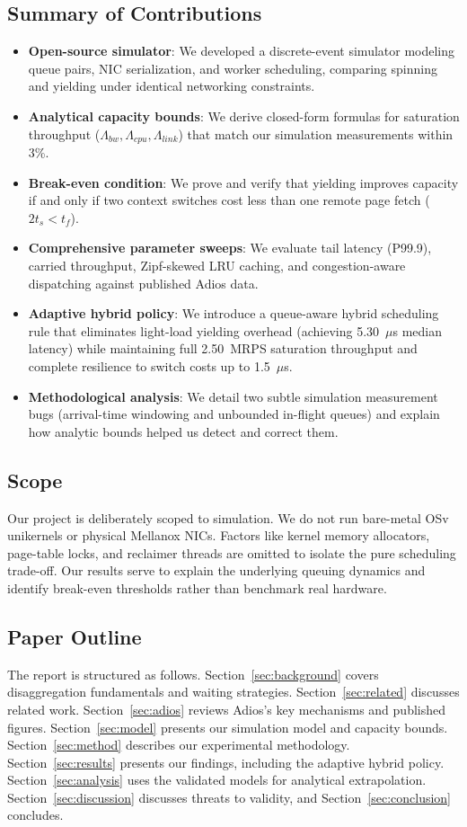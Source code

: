 \subsection*{Summary of Contributions}
\begin{itemize}
\item \textbf{Open-source simulator}: We developed a discrete-event simulator modeling queue pairs, NIC serialization, and worker scheduling, comparing spinning and yielding under identical networking constraints.
\item \textbf{Analytical capacity bounds}: We derive closed-form formulas for saturation throughput ($\Lambda_{bw}, \Lambda_{cpu}, \Lambda_{link}$) that match our simulation measurements within 3\%.
\item \textbf{Break-even condition}: We prove and verify that yielding improves capacity if and only if two context switches cost less than one remote page fetch ($2t_s < t_f$).
\item \textbf{Comprehensive parameter sweeps}: We evaluate tail latency (P99.9), carried throughput, Zipf-skewed LRU caching, and congestion-aware dispatching against published Adios data.
\item \textbf{Adaptive hybrid policy}: We introduce a queue-aware hybrid scheduling rule that eliminates light-load yielding overhead (achieving 5.30~$\mu$s median latency) while maintaining full 2.50~MRPS saturation throughput and complete resilience to switch costs up to 1.5~$\mu$s.
\item \textbf{Methodological analysis}: We detail two subtle simulation measurement bugs (arrival-time windowing and unbounded in-flight queues) and explain how analytic bounds helped us detect and correct them.
\end{itemize}

\subsection*{Scope}
Our project is deliberately scoped to simulation. We do not run bare-metal OSv unikernels or physical Mellanox NICs. Factors like kernel memory allocators, page-table locks, and reclaimer threads are omitted to isolate the pure scheduling trade-off. Our results serve to explain the underlying queuing dynamics and identify break-even thresholds rather than benchmark real hardware.

\subsection*{Paper Outline}
The report is structured as follows. Section~\ref{sec:background} covers disaggregation fundamentals and waiting strategies. Section~\ref{sec:related} discusses related work. Section~\ref{sec:adios} reviews Adios's key mechanisms and published figures. Section~\ref{sec:model} presents our simulation model and capacity bounds. Section~\ref{sec:method} describes our experimental methodology. Section~\ref{sec:results} presents our findings, including the adaptive hybrid policy. Section~\ref{sec:analysis} uses the validated models for analytical extrapolation. Section~\ref{sec:discussion} discusses threats to validity, and Section~\ref{sec:conclusion} concludes.
